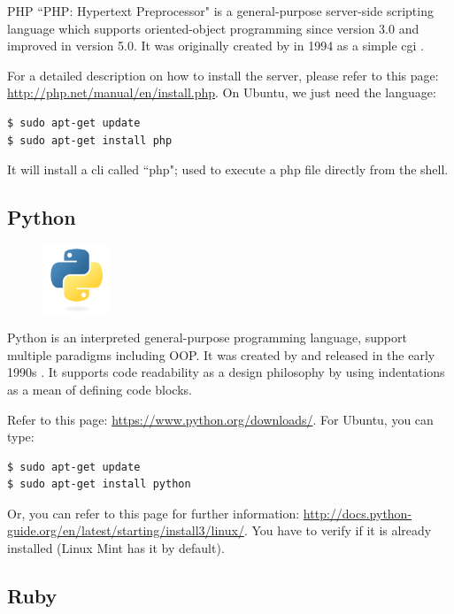 \documentclass{KodeBook}
\begin{document}
PHP ``PHP: Hypertext Preprocessor" is a general-purpose server-side scripting language which supports oriented-object programming since version 3.0  and improved in version 5.0.
It was originally created by  in 1994 as a simple \ac{cgi} \citep{2018-cowburn}. 

For a detailed description on how to install the server, please refer to this page: \url{http://php.net/manual/en/install.php}.
On Ubuntu, we just need the language:
\begin{lstlisting}[style=shellStyle]
$ sudo apt-get update
$ sudo apt-get install php
\end{lstlisting}
It will install a \ac{cli} called ``php"; used to execute a php file directly from the shell.

\subsection{Python}

\begin{figure}
	\centering
	\vspace{-20pt}
	\includegraphics[width=2cm]{../img/Python.pdf}
	\vspace{-20pt}
\end{figure}

Python is an interpreted general-purpose programming language, support multiple paradigms including OOP. 
It was created by  and released in the early 1990s \cite{2018-python2.7}.
It supports code readability as a design philosophy by using indentations as a mean of defining code blocks.

Refer to this page: \url{https://www.python.org/downloads/}. 
For Ubuntu, you can type:
\begin{lstlisting}[style=shellStyle]
$ sudo apt-get update
$ sudo apt-get install python
\end{lstlisting}
Or, you can refer to this page for further information: \url{http://docs.python-guide.org/en/latest/starting/install3/linux/}.
You have to verify if it is already installed (Linux Mint has it by default).

\subsection{Ruby}
\end{document}
